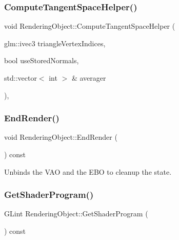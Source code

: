 \hypertarget{class_rendering_object_a053e68759fe406779c6b6cfa080602bf}{}\label{class_rendering_object_a053e68759fe406779c6b6cfa080602bf}
\subsubsection{\texorpdfstring{Compute\+Tangent\+Space\+Helper()}{ComputeTangentSpaceHelper()}}
{\footnotesize\ttfamily void Rendering\+Object\+::\+Compute\+Tangent\+Space\+Helper (\begin{DoxyParamCaption}\item[{glm\+::ivec3}]{triangle\+Vertex\+Indices,  }\item[{bool}]{use\+Stored\+Normals,  }\item[{std\+::vector$<$ int $>$ \&}]{averager }\end{DoxyParamCaption})\hspace{0.3cm}{\ttfamily [private]}, {\ttfamily [virtual]}}

\hypertarget{class_rendering_object_abc5f87208a9c918f3d281dd673cb5a24}{}\label{class_rendering_object_abc5f87208a9c918f3d281dd673cb5a24}
\subsubsection{\texorpdfstring{End\+Render()}{EndRender()}}
{\footnotesize\ttfamily void Rendering\+Object\+::\+End\+Render (\begin{DoxyParamCaption}{ }\end{DoxyParamCaption}) const\hspace{0.3cm}{\ttfamily [virtual]}}



Unbinds the V\+AO and the E\+BO to cleanup the state.

\hypertarget{class_rendering_object_abe3637190e30c5483e9505743c75bcdb}{}\label{class_rendering_object_abe3637190e30c5483e9505743c75bcdb}
\subsubsection{\texorpdfstring{Get\+Shader\+Program()}{GetShaderProgram()}}
{\footnotesize\ttfamily G\+Lint Rendering\+Object\+::\+Get\+Shader\+Program (\begin{DoxyParamCaption}{ }\end{DoxyParamCaption}) const}



